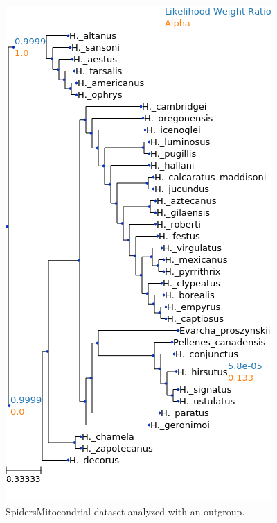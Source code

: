 \documentclass{article}
\begin{document}
\begin{figure}
  \begin{center}
    \includegraphics[width=.75\linewidth]{figs/spiders/mito_outgroup_lwr.png}
    \caption{SpidersMitocondrial dataset analyzed with an outgroup.}
    \label{fig:spiders-mito-outgroup}
  \end{center}
\end{figure}

%
\end{document}
